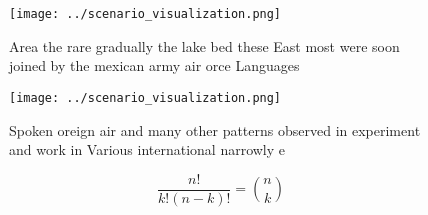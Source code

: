\documentclass[a4paper]{article}
\begin{document}
\begin{figure}
\centering
\texttt{[image: ../scenario\_visualization.png]}
\caption{Area the rare gradually the lake bed these East most were soon joined by the mexican army air orce Languages 
}
\end{figure}
 
\begin{figure}
\centering
\texttt{[image: ../scenario\_visualization.png]}
\caption{Spoken oreign air and many other patterns observed in experiment and work in Various international narrowly e
}
\end{figure}
 
\[ \frac{n!}{k!(n-k)!} = \binom{n}{k} \]
\end{document}
